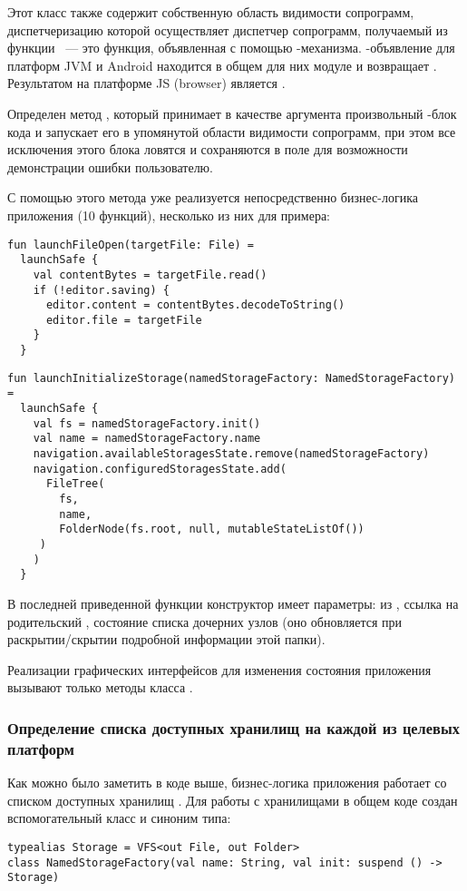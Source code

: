     Этот класс также содержит собственную область видимости сопрограмм, диспетчеризацию которой осуществляет диспетчер сопрограмм, получаемый из функции ~--- это функция, объявленная с помощью -механизма. -объявление для платформ JVM и Android находится в общем для них модуле и возвращает . Результатом на платформе JS (browser) является . 

    Определен метод , который принимает в качестве аргумента произвольный -блок кода и запускает его в упомянутой области видимости сопрограмм, при этом все исключения этого блока ловятся и сохраняются в поле  для возможности демонстрации ошибки пользователю.

    С помощью этого метода уже реализуется непосредственно бизнес-логика приложения (10 функций), несколько из них для примера: 

    \begin{verbatim}
fun launchFileOpen(targetFile: File) =
  launchSafe {
    val contentBytes = targetFile.read()
    if (!editor.saving) {
      editor.content = contentBytes.decodeToString()
      editor.file = targetFile
    }
  }
    \end{verbatim}

    \begin{verbatim}
fun launchInitializeStorage(namedStorageFactory: NamedStorageFactory) =
  launchSafe {
    val fs = namedStorageFactory.init()
    val name = namedStorageFactory.name
    navigation.availableStoragesState.remove(namedStorageFactory)
    navigation.configuredStoragesState.add(
      FileTree(
        fs,
        name,
        FolderNode(fs.root, null, mutableStateListOf())
     )
    )
  }
    \end{verbatim}

    В последней приведенной функции конструктор  имеет параметры:  из , ссылка на родительский , состояние списка дочерних узлов (оно обновляется при раскрытии/скрытии подробной информации этой папки).

    Реализации графических интерфейсов для изменения состояния приложения вызывают только методы класса .

  \subsubsection{Определение списка доступных хранилищ на каждой из целевых платформ}
    Как можно было заметить в коде выше, бизнес-логика приложения работает со списком доступных хранилищ . Для работы с хранилищами  в общем коде создан вспомогательный класс и синоним типа:
    \begin{verbatim}
typealias Storage = VFS<out File, out Folder>
class NamedStorageFactory(val name: String, val init: suspend () -> Storage)
    \end{verbatim}

